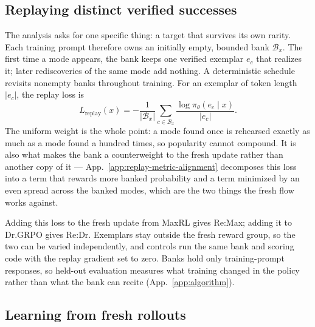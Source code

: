 \documentclass{article}
\newcommand{\1}{\mathbf 1}
\theoremstyle{remark}
\theoremstyle{definition}
\theoremstyle{plain}
\begin{document}
\subsection{Replaying distinct verified successes}
\label{sec:replay}

The analysis asks for one specific thing: a target that survives its own rarity.
Each training prompt therefore owns an initially empty, bounded bank
$\mathcal B_x$. The first time a mode appears, the bank keeps one verified
exemplar $e_c$ that realizes it; later rediscoveries of the same mode add
nothing. A deterministic schedule revisits nonempty banks throughout training.
For an exemplar of token length $|e_c|$, the replay loss is
\begin{equation}
 L_{\mathrm{replay}}(x)=-\frac{1}{|\mathcal B_x|}
 \sum_{c\in\mathcal B_x}\frac{\log\pi_\theta(e_c\mid x)}{|e_c|}.
 \label{eq:lm-verified-replay}
\end{equation}
The uniform weight is the whole point: a mode found once is rehearsed exactly as
much as a mode found a hundred times, so popularity cannot compound. It is also
what makes the bank a counterweight to the fresh update rather than
another copy of it --- App.~\ref{app:replay-metric-alignment} decomposes this
loss into a term that rewards more banked probability and a term minimized by an
even spread across the banked modes, which are the two things the fresh flow
works against.


Adding this loss to the fresh update from MaxRL gives Re:Max; adding it to
Dr.GRPO gives Re:Dr. Exemplars stay outside the fresh reward group, so the two can be
varied independently, and controls run the same bank and scoring code with the
replay gradient set to zero. Banks hold only training-prompt responses, so
held-out evaluation measures what training changed in the policy rather than
what the bank can recite (App.~\ref{app:algorithm}).

\subsection{Learning from fresh rollouts}
\label{sec:maxrl-method}
\end{document}

